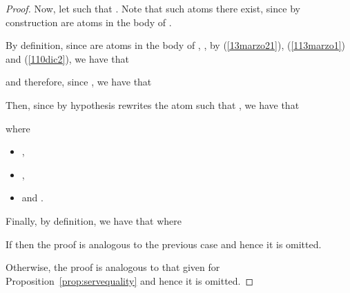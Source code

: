 \documentclass{tlp}
\begin{document}
\begin{proof}
Now, let  such that . Note that such atoms there exist, since by construction  are atoms in the body of .

  By definition, since
 are atoms in the body of , , by (\ref{13marzo21}), (\ref{113marzo1}) and (\ref{110dic2}),  we have that

 and therefore, since , we have that

Then, since by hypothesis  rewrites the atom  such that , we have that

     where
     \begin{itemize}
       \item ,
       \item  ,
       \item  and
       .
     \end{itemize}
Finally, by definition, we have that
 where
  

  If  then the proof is analogous to the previous case and hence it is omitted.

  Otherwise, the proof is analogous to that given for Proposition~\ref{prop:servequality} and hence it is omitted.
\end{proof}
\end{document}
